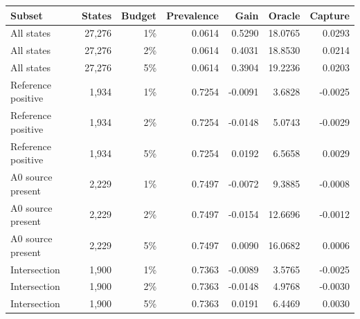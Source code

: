 \begin{center}
\begin{minipage}{\linewidth}
\centering
\small
\setlength{\tabcolsep}{4pt}
\label{tab:target-rich}
\begin{tabular}{lrrrrrr}
\toprule
Subset & States & Budget & Prevalence & Gain & Oracle & Capture \\
\midrule
All states & 27,276 & 1\% & 0.0614 & 0.5290 & 18.0765 & 0.0293 \\
All states & 27,276 & 2\% & 0.0614 & 0.4031 & 18.8530 & 0.0214 \\
All states & 27,276 & 5\% & 0.0614 & 0.3904 & 19.2236 & 0.0203 \\
Reference positive & 1,934 & 1\% & 0.7254 & -0.0091 & 3.6828 & -0.0025 \\
Reference positive & 1,934 & 2\% & 0.7254 & -0.0148 & 5.0743 & -0.0029 \\
Reference positive & 1,934 & 5\% & 0.7254 & 0.0192 & 6.5658 & 0.0029 \\
A0 source present & 2,229 & 1\% & 0.7497 & -0.0072 & 9.3885 & -0.0008 \\
A0 source present & 2,229 & 2\% & 0.7497 & -0.0154 & 12.6696 & -0.0012 \\
A0 source present & 2,229 & 5\% & 0.7497 & 0.0090 & 16.0682 & 0.0006 \\
Intersection & 1,900 & 1\% & 0.7363 & -0.0089 & 3.5765 & -0.0025 \\
Intersection & 1,900 & 2\% & 0.7363 & -0.0148 & 4.9768 & -0.0030 \\
Intersection & 1,900 & 5\% & 0.7363 & 0.0191 & 6.4469 & 0.0030 \\
\bottomrule
\end{tabular}
\end{minipage}
\end{center}
